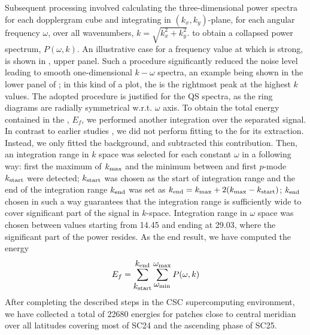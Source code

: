 \documentclass{aa}
\begin{document}
Subsequent processing involved calculating the 
three-dimensional
power spectra for each dopplergram cube and 
integrating
in $(k_x, k_y)$-plane, for each 
angular
frequency $\omega$,
over all wavenumbers, 
$k=\sqrt{k_x^2+k_y^2}$.
to obtain a collapsed power spectrum, $P(\omega,k)$. An illustrative case for a frequency
value at which \fff is strong, is shown in 
,
upper panel.
Such a procedure
significantly reduced the noise level leading to smooth one-dimensional $k-\omega$ spectra,
an example being shown in the lower panel of ;
in this kind of a plot, the \fff is the rightmost peak at the highest $k$ values.
The adopted procedure
is justified for the 
QS
spectra, as the ring diagrams are radially symmetrical w.r.t. $\omega$ axis. 
To obtain the total energy contained in the \fffns, $E_f$, we
performed another integration over the separated \fff signal.
In contrast to earlier studies \citep{SRB16,Waidele22}, we
did not perform fitting to the \fff for its extraction. 
Instead, we only fitted the background, and subtracted this 
contribution.
Then,
an integration range in $k$ space was selected for each constant $\omega$ in a following way: first the maximum of \fff $k_{\rm max}$ and the minimum between \fff and first $p$-mode $k_{\rm start}$ were detected; $k_{\rm start}$ was chosen as the start of integration range and the end of the integration range $k_{\rm end}$ was set as $k_{\rm end}=k_{\rm max}+2(k_{\rm max}-k_{\rm start})$; $k_{\rm end}$ chosen in such a way guarantees that the integration range is sufficiently wide to cover significant part of the \fff 
signal in $k$-space.
Integration range in $\omega$ space was chosen between values starting from 
14.45 and ending at 29.03, 
where the significant part of the \fff power resides. 
As the end result, we have computed the \fff energy
\begin{equation}
E_f=
\sum_{\mbox{$k_{\rm start}$}}^{\mbox{$k_{\rm end}$}}
\sum_{\mbox{$\omega_{\rm min}$}}^{\mbox{$\omega_{\rm max}$}} P(\omega,k)
\end{equation}
After completing the described steps in the CSC supercomputing
environment, we have collected a total of 
22680
\fff
energies
for patches close to central meridian over all latitudes covering 
most of SC24 and the ascending phase of SC25.
\end{document}
